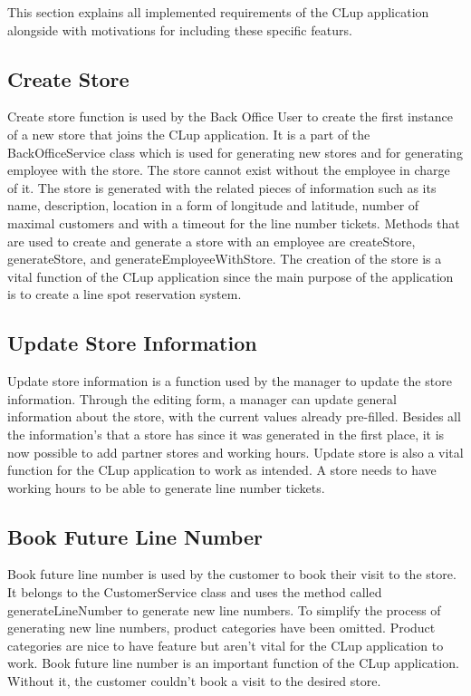 This section explains all implemented requirements of the CLup application alongside with motivations for including these specific featurs.

\subsection{Create Store}

Create store function is used by the Back Office User to create the first instance of a new store that joins the CLup application.
It is a part of the BackOfficeService class which is used for generating new stores and for generating employee with the store.
The store cannot exist without the employee in charge of it.
The store is generated with the related pieces of information such as its name, description,
location in a form of longitude and latitude, number of maximal customers and with a timeout for the line number tickets.
Methods that are used to create and generate a store with an employee are createStore, generateStore, and generateEmployeeWithStore.
The creation of the store is a vital function of the CLup application since the main purpose of the application is to create a line spot reservation system.

\subsection{Update Store Information}
Update store information is a function used by the manager to update the store information.
Through the editing form, a manager can update general information about the store, with the current values already pre-filled.
Besides all the information's that a store has since it was generated in the first place, it is now possible to add partner stores and working hours.
Update store is also a vital function for the CLup application to work as intended.
A store needs to have working hours to be able to generate line number tickets.

\subsection{Book Future Line Number}
Book future line number is used by the customer to book their visit to the store.
It belongs to the CustomerService class and uses the method called generateLineNumber to generate new line numbers.
To simplify the process of generating new line numbers, product categories have been omitted.
Product categories are nice to have feature but aren’t vital for the CLup application to work.
Book future line number is an important function of the CLup application.
Without it, the customer couldn’t book a visit to the desired store.

